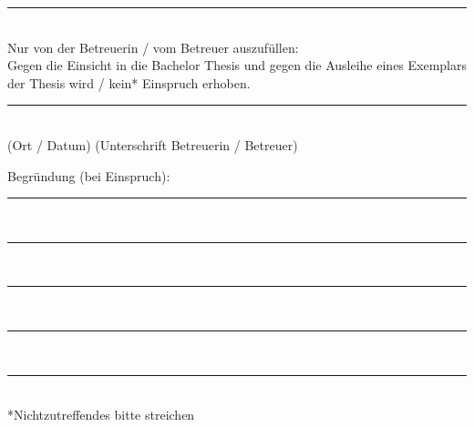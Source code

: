 \rule[0ex]{\textwidth}{0.4pt} \\[5ex]
Nur von der Betreuerin / vom Betreuer auszuf\"ullen: \\[2ex]
Gegen die Einsicht in die Bachelor Thesis  und gegen die Ausleihe eines Exemplars der Thesis wird / kein* Einspruch 
erhoben.
\par \vspace{10mm}
\rule[0ex]{\textwidth}{0.4pt}\\
(Ort / Datum)\hspace{30ex} (Unterschrift Betreuerin / Betreuer)
\par
Begr\"undung (bei Einspruch): \\[5ex]
\rule[0ex]{\textwidth}{0.4pt} \\[2ex]
\rule[0ex]{\textwidth}{0.4pt} \\[2ex]
\rule[0ex]{\textwidth}{0.4pt} \\[2ex]
\rule[0ex]{\textwidth}{0.4pt} \\[2ex]
\rule[0ex]{\textwidth}{0.4pt} \\[5ex]
*Nichtzutreffendes bitte streichen
\newpage
%
